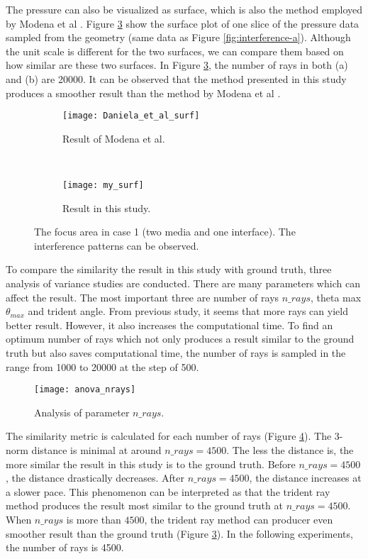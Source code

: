 The pressure can also be visualized as surface, which is also the method employed by Modena et al \cite{Modena_2018}. Figure \ref{fig:surface} show the surface plot of one slice of the pressure data sampled from the geometry (same data as Figure \ref{fig:interference-a}). Although the unit scale is different for the two surfaces, we can compare them based on how similar are these two surfaces. In Figure \ref{fig:surface}, the number of rays in both (a) and (b) are 20000. It can be observed that the method presented in this study produces a smoother result than the method by Modena et al \cite{Modena_2018}.

\begin{figure}[h]
    \centering
    \begin{subfigure}[b]{0.45\textwidth}
        \texttt{[image: Daniela\_et\_al\_surf]}
        \caption{Result of Modena et al.}
        \label{fig:surface-a}
    \end{subfigure}
    ~ %
    \begin{subfigure}[b]{0.45\textwidth}
        \texttt{[image: my\_surf]}
        \caption{Result in this study.}
        \label{fig:surface-b}
    \end{subfigure}
    \caption{The focus area in case 1 (two media and one interface). The interference patterns can be observed.} \label{fig:surface}
\end{figure}

To compare the similarity the result in this study with ground truth, three analysis of variance studies are conducted. There are many parameters which can affect the result. The most important three are number of rays $n\_rays$, theta max $\theta_{max}$ and trident angle. From previous study, it seems that more rays can yield better result. However, it also increases the computational time. To find an optimum number of rays which not only produces a result similar to the ground truth but also saves computational time, the number of rays is sampled in the range from 1000 to 20000 at the step of 500.

\begin{figure}[h]
    \centering
    \texttt{[image: anova\_nrays]}
    \caption{Analysis of parameter $n\_rays$.}
    \label{fig:anova_nrays}
\end{figure}

The similarity metric is calculated for each number of rays (Figure \ref{fig:anova_nrays}). The 3-norm distance is minimal at around $n\_rays=4500$. The less the distance is, the more similar the result in this study is to the ground truth. Before $n\_rays=4500$, the distance drastically decreases. After $n\_rays=4500$, the distance increases at a slower pace. This phenomenon can be interpreted as that the trident ray method produces the result most similar to the ground truth at $n\_rays=4500$. When $n\_rays$ is more than $4500$, the trident ray method can producer even smoother result than the ground truth (Figure \ref{fig:surface}). In the following experiments, the number of rays is 4500. 

